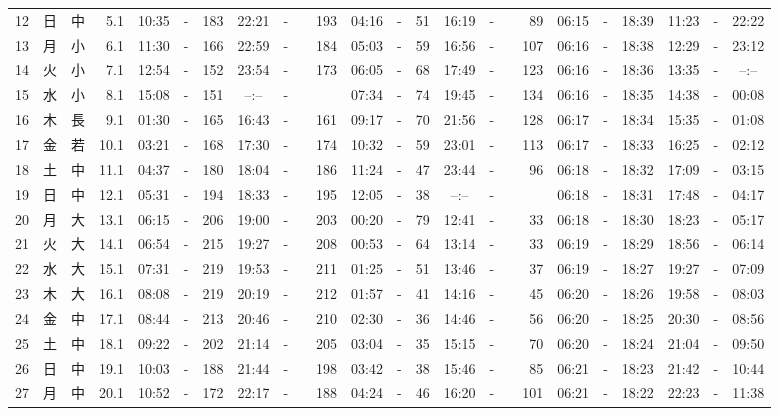\documentclass[12pt,a4j]{jsarticle}
\begin{document}
\begin{table}[htbp]
\begin{center}
{\begin{tabular}{|rc|cr|ccrccr|ccrccr|ccc|ccc|}
12 & 日 & 中 &  5.1 &  10:35 &-& 183 &  22:21 &-& 193 &  04:16 &-&  51 &  16:19 &-&  89 & 06:15 & -& 18:39 & 11:23 & -& 22:22 \\
13 & 月 & 小 &  6.1 &  11:30 &-& 166 &  22:59 &-& 184 &  05:03 &-&  59 &  16:56 &-& 107 & 06:16 & -& 18:38 & 12:29 & -& 23:12 \\
14 & 火 & 小 &  7.1 &  12:54 &-& 152 &  23:54 &-& 173 &  06:05 &-&  68 &  17:49 &-& 123 & 06:16 & -& 18:36 & 13:35 & -& --:-- \\
15 & 水 & 小 &  8.1 &  15:08 &-& 151 &  --:-- &-&~~~~~ &  07:34 &-&  74 &  19:45 &-& 134 & 06:16 & -& 18:35 & 14:38 & -& 00:08 \\
16 & 木 & 長 &  9.1 &  01:30 &-& 165 &  16:43 &-& 161 &  09:17 &-&  70 &  21:56 &-& 128 & 06:17 & -& 18:34 & 15:35 & -& 01:08 \\
17 & 金 & 若 & 10.1 &  03:21 &-& 168 &  17:30 &-& 174 &  10:32 &-&  59 &  23:01 &-& 113 & 06:17 & -& 18:33 & 16:25 & -& 02:12 \\
18 & 土 & 中 & 11.1 &  04:37 &-& 180 &  18:04 &-& 186 &  11:24 &-&  47 &  23:44 &-&  96 & 06:18 & -& 18:32 & 17:09 & -& 03:15 \\
19 & 日 & 中 & 12.1 &  05:31 &-& 194 &  18:33 &-& 195 &  12:05 &-&  38 &  --:-- &-&~~~~~ & 06:18 & -& 18:31 & 17:48 & -& 04:17 \\
20 & 月 & 大 & 13.1 &  06:15 &-& 206 &  19:00 &-& 203 &  00:20 &-&  79 &  12:41 &-&  33 & 06:18 & -& 18:30 & 18:23 & -& 05:17 \\
21 & 火 & 大 & 14.1 &  06:54 &-& 215 &  19:27 &-& 208 &  00:53 &-&  64 &  13:14 &-&  33 & 06:19 & -& 18:29 & 18:56 & -& 06:14 \\
22 & 水 & 大 & 15.1 &  07:31 &-& 219 &  19:53 &-& 211 &  01:25 &-&  51 &  13:46 &-&  37 & 06:19 & -& 18:27 & 19:27 & -& 07:09 \\
23 & 木 & 大 & 16.1 &  08:08 &-& 219 &  20:19 &-& 212 &  01:57 &-&  41 &  14:16 &-&  45 & 06:20 & -& 18:26 & 19:58 & -& 08:03 \\
24 & 金 & 中 & 17.1 &  08:44 &-& 213 &  20:46 &-& 210 &  02:30 &-&  36 &  14:46 &-&  56 & 06:20 & -& 18:25 & 20:30 & -& 08:56 \\
25 & 土 & 中 & 18.1 &  09:22 &-& 202 &  21:14 &-& 205 &  03:04 &-&  35 &  15:15 &-&  70 & 06:20 & -& 18:24 & 21:04 & -& 09:50 \\
26 & 日 & 中 & 19.1 &  10:03 &-& 188 &  21:44 &-& 198 &  03:42 &-&  38 &  15:46 &-&  85 & 06:21 & -& 18:23 & 21:42 & -& 10:44 \\
27 & 月 & 中 & 20.1 &  10:52 &-& 172 &  22:17 &-& 188 &  04:24 &-&  46 &  16:20 &-& 101 & 06:21 & -& 18:22 & 22:23 & -& 11:38 \\

\end{tabular}}
\end{center}
\end{table}
\end{document}
